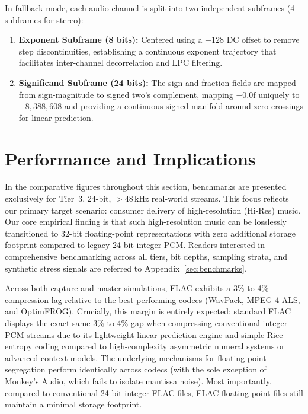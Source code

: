 \documentclass[10pt,twocolumn]{article}
\begin{document}
In fallback mode, each audio channel is split into two independent subframes (4 subframes for stereo):
\begin{enumerate}
	\item \textbf{Exponent Subframe (8 bits):} Centered using a $-128$ DC offset to remove step discontinuities, establishing a continuous exponent trajectory that facilitates inter-channel decorrelation and LPC filtering.
	\item \textbf{Significand Subframe (24 bits):} The sign and fraction fields are mapped from sign-magnitude to signed two's complement, mapping $-0.0\text{f}$ uniquely to $-8{,}388{,}608$ and providing a continuous signed manifold around zero-crossings for linear prediction.
\end{enumerate}

\section{Performance and Implications}

In the comparative figures throughout this section, benchmarks are presented exclusively for Tier~3, 24-bit, $>48$\,kHz real-world streams. This focus reflects our primary target scenario: consumer delivery of high-resolution (Hi-Res) music. Our core empirical finding is that such high-resolution music can be losslessly transitioned to 32-bit floating-point representations with zero additional storage footprint compared to legacy 24-bit integer PCM. Readers interested in comprehensive benchmarking across all tiers, bit depths, sampling strata, and synthetic stress signals are referred to Appendix~\ref{sec:benchmarks}.

Across both capture and master simulations, FLAC exhibits a 3\% to 4\% compression lag relative to the best-performing codecs (WavPack, MPEG-4 ALS, and OptimFROG). Crucially, this margin is entirely expected: standard FLAC displays the exact same 3\% to 4\% gap when compressing conventional integer PCM streams due to its lightweight linear prediction engine and simple Rice entropy coding compared to high-complexity asymmetric numeral systems or advanced context models. The underlying mechanisms for floating-point segregation perform identically across codecs (with the sole exception of Monkey's Audio, which fails to isolate mantissa noise). Most importantly, compared to conventional 24-bit integer FLAC files, FLAC floating-point files still maintain a minimal storage footprint.
\end{document}
